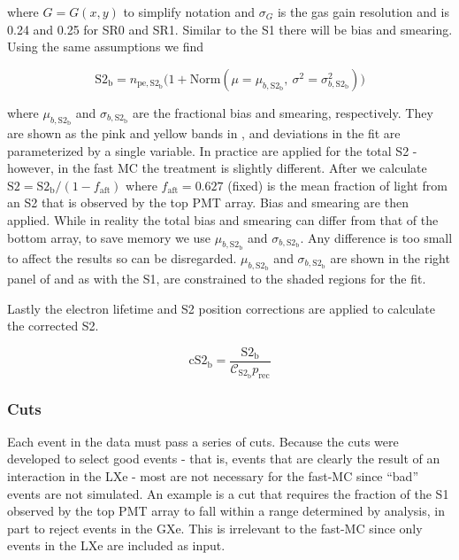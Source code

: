 \noindent where $G = G(x, y)$ to simplify notation and $\sigma_G$ is the gas gain resolution and is 0.24 and 0.25 for SR0 and
SR1.  Similar to the S1 there will be bias and smearing.  Using the same assumptions we find

\begin{equation}
\mathrm{S2_b} = n_{\mathrm{pe,S2_b}} \Big( 1 + \mathrm{Norm}(\mu = \mu_{b, \mathrm{S2_b}},\ \sigma^2 = \sigma_{b, \mathrm{S2_b}}^2) \Big)
\label{eq:er_nr_calibrations_parameter_determ_det_phys_s2_bias_smear}
\end{equation}

\noindent where $\mu_{b, \mathrm{S2_b}}$ and $\sigma_{b, \mathrm{S2_b}}$ are the \stwob fractional bias and smearing,
respectively.  They are shown as the pink and yellow bands in , and
deviations in the fit are parameterized by a single variable.  In
practice  are applied
for the total S2 - however, in the fast MC the treatment is slightly different.  After
 we calculate
$\mathrm{S2} = \mathrm{S2_b} / (1 - f_{\mathrm{aft}})$ where $f_{\mathrm{aft}} = 0.627$ (fixed) is the mean fraction of light from an
S2 that is observed by the top PMT array.  Bias and smearing are then applied.  While in reality the total bias and smearing
can differ from that of the bottom array, to save memory we use $\mu_{b, \mathrm{S2_b}}$ and $\sigma_{b, \mathrm{S2_b}}$.  Any
difference is too small to affect the results so can be disregarded.  $\mu_{b, \mathrm{S2_b}}$ and $\sigma_{b, \mathrm{S2_b}}$ are shown
in the right panel of  and as with the S1, are constrained to the
shaded regions for the fit.

Lastly the electron lifetime and S2 position corrections are applied to calculate the corrected S2.

\begin{equation}
\mathrm{cS2_b} = \frac{\mathrm{S2_b}}{\mathcal{C}_{\mathrm{S2_b}} p_{\mathrm{rec}}}
\end{equation}



\subsubsection{Cuts}
\label{subsubsec:er_nr_calibrations_parameter_determ_cuts}
Each event in the data must pass a series of cuts.  Because the cuts were developed to select good events - that is, events that are
clearly the result of an interaction in the LXe - most are not necessary for the fast-MC since ``bad'' events are not simulated.  An
example is a cut that requires the fraction of the S1 observed by the top PMT array to fall within a range determined by analysis, in
part to reject events in the GXe.  This is irrelevant to the fast-MC since only events in the LXe are included as input.

